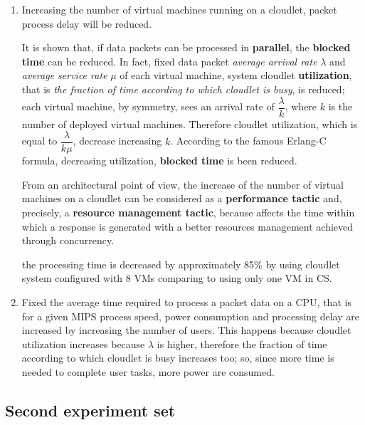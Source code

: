 \documentclass[sigchi]{acmart}
\begin{document}
\begin{enumerate}

\item Increasing the number of virtual machines running on a cloudlet, packet process delay will be reduced.

It is shown that, if data packets can be processed in \textbf{parallel}, the \textbf{blocked time} can be reduced. In fact, fixed data packet \textit{average arrival rate} $\lambda$ and \textit{average service rate} $\mu$ of each virtual machine, system cloudlet \textbf{utilization}, that is \textit{the fraction of time according to which cloudlet is busy}, is reduced; each virtual machine, by symmetry, sees an arrival rate of $\dfrac{\lambda}{k}$, where $k$ is the number of deployed virtual machines. Therefore cloudlet utilization, which is equal to $\dfrac{\lambda}{k\mu}$, decrease increasing $k$. According to the famous Erlang-C formula, decreasing utilization, \textbf{blocked time} is been reduced.

From an architectural point of view, the increase of the number of virtual machines on a cloudlet can be considered as a \textbf{performance tactic} and, precisely, a \textbf{resource management tactic}, because affects the time within which a response is generated with a better resources management achieved through concurrency.

\vspace{0.3cm}

\begin{quoting}[font=itshape, begintext={``}, endtext={''\cite[par.~3.3]{MSAReport}}]
the processing time is decreased by approximately 85\% by using cloudlet system configured with 8 VMs comparing to using only one VM in CS.
\end{quoting}

\vspace{0.3cm}

\item Fixed the average time required to process a packet data on a CPU, that is for a given MIPS process speed, power consumption and processing delay are increased by increasing the number of users. This happens because cloudlet utilization increases because $\lambda$ is higher, therefore the fraction of time according to which cloudlet is busy increases too; so, since more time is needed to complete user tasks, more power are consumed.

\end{enumerate}

\subsection{Second experiment set}
\end{document}
